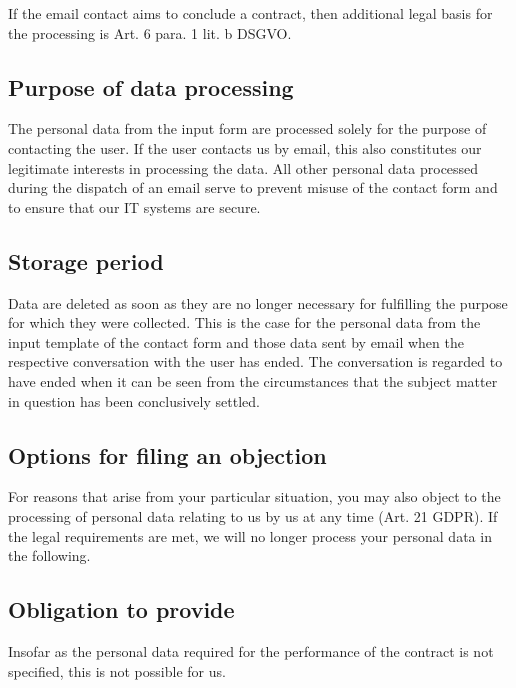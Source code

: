 \documentclass[letterpaper,10pt,english]{sphinxmanual}
\begin{document}
\sphinxAtStartPar
If the email contact aims to conclude a contract, then additional legal basis for the processing is Art. 6 para. 1 lit. b DSGVO.


\subsection{Purpose of data processing}
\label{\detokenize{policies/privacy:id6}}
\sphinxAtStartPar
The personal data from the input form are processed solely for the purpose of contacting the user. If the user contacts us by email, this also constitutes our legitimate interests in processing the data.
All other personal data processed during the dispatch of an email serve to prevent misuse of the contact form and to ensure that our IT systems are secure.


\subsection{Storage period}
\label{\detokenize{policies/privacy:id7}}
\sphinxAtStartPar
Data are deleted as soon as they are no longer necessary for fulfilling the purpose for which they were collected. This is the case for the personal data from the input template of the contact form and those data sent by email when the respective conversation with the user has ended. The conversation is regarded to have ended when it can be seen from the circumstances that the subject matter in question has been conclusively settled.


\subsection{Options for filing an objection}
\label{\detokenize{policies/privacy:options-for-filing-an-objection}}
\sphinxAtStartPar
For reasons that arise from your particular situation, you may also object to the processing of personal data relating to us by us at any time (Art. 21 GDPR). If the legal requirements are met, we will no longer process your personal data in the following.


\subsection{Obligation to provide}
\label{\detokenize{policies/privacy:obligation-to-provide}}
\sphinxAtStartPar
Insofar as the personal data required for the performance of the contract is not specified, this is not possible for us.
\end{document}
